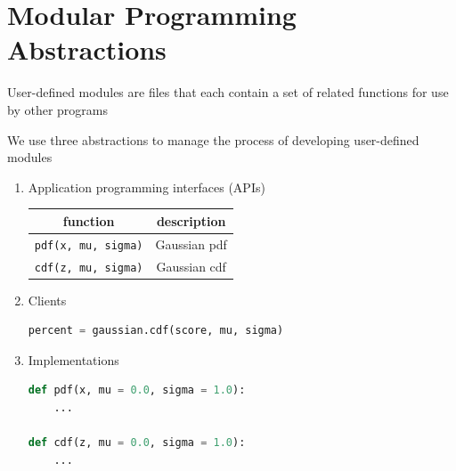 \documentclass[8pt,a4paper,compress]{beamer}
\begin{document}
\section{Modular Programming Abstractions}
\begin{frame}[fragile]
\pause
User-defined modules are files that each contain a set of related functions for use by other programs

\pause
\bigskip

We use three abstractions to manage the process of developing user-defined modules
\begin{enumerate}
\item Application programming interfaces (APIs)
\begin{center}
\begin{tabular}{cc}
function & description \\ \hline
\lstinline$pdf(x, mu, sigma)$ & Gaussian pdf \\
\lstinline$cdf(z, mu, sigma)$ & Gaussian cdf \\
\end{tabular} 
\end{center}

\item Clients
\begin{lstlisting}[language=Python]
percent = gaussian.cdf(score, mu, sigma)
\end{lstlisting}

\item Implementations
\begin{lstlisting}[language=Python]
def pdf(x, mu = 0.0, sigma = 1.0):
    ...
    
def cdf(z, mu = 0.0, sigma = 1.0):
    ...
\end{lstlisting}
\end{enumerate}
\end{frame}
\end{document}

